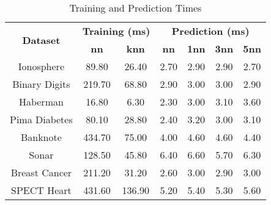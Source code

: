 \begin{table}[htbp]
\caption{Training and Prediction Times}
\begin{center}
\begin{tabular}{|c|c|c|c|c|c|c|}
\hline
\multirow{2}{*}{\textbf{Dataset}} & \multicolumn{2}{c|}{\textbf{Training (ms)}} & \multicolumn{4}{c|}{\textbf{Prediction (ms)}} \\ \cline{2-7}
 & \textbf{nn} & \textbf{knn} & \textbf{nn} & \textbf{1nn} & \textbf{3nn} & \textbf{5nn} \\ \hline
Ionosphere & 89.80 & 26.40 & 2.70 & 2.90 & 2.90 & 2.70 \\ \hline
Binary Digits & 219.70 & 68.80 & 2.90 & 3.00 & 3.00 & 2.90 \\ \hline
Haberman & 16.80 & 6.30 & 2.30 & 3.00 & 3.10 & 3.60 \\ \hline
Pima Diabetes & 80.10 & 28.80 & 2.40 & 3.20 & 3.00 & 3.10 \\ \hline
Banknote & 434.70 & 75.00 & 4.00 & 4.60 & 4.60 & 4.40 \\ \hline
Sonar & 128.50 & 45.80 & 6.40 & 6.60 & 5.70 & 6.30 \\ \hline
Breast Cancer & 211.20 & 31.20 & 2.60 & 3.00 & 2.90 & 3.00 \\ \hline
SPECT Heart & 431.60 & 136.90 & 5.20 & 5.40 & 5.30 & 5.60 \\ \hline
\end{tabular}
\label{tab:timing}
\end{center}
\end{table}